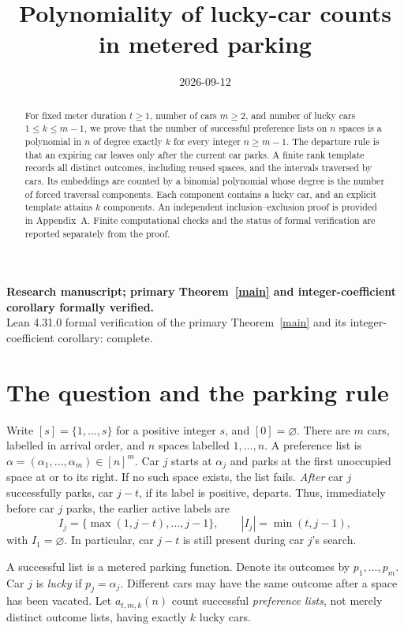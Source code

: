\documentclass[11pt]{article}
\title{Polynomiality of lucky-car counts in metered parking}
\author{}
\date{2026-09-12}
\theoremstyle{definition}
\begin{document}
\maketitle
\begin{center}
\textbf{Research manuscript; primary Theorem~\ref{main} and integer-coefficient corollary formally verified.}\\
Lean 4.31.0 formal verification of the primary Theorem~\ref{main} and its integer-coefficient corollary: complete.
\end{center}
\begin{abstract}
For fixed meter duration $t\ge1$, number of cars $m\ge2$, and number of lucky cars $1\le k\le m-1$, we prove that the number of successful preference lists on $n$ spaces is a polynomial in $n$ of degree exactly $k$ for every integer $n\ge m-1$. The departure rule is that an expiring car leaves only after the current car parks. A finite rank template records all distinct outcomes, including reused spaces, and the intervals traversed by cars. Its embeddings are counted by a binomial polynomial whose degree is the number of forced traversal components. Each component contains a lucky car, and an explicit template attains $k$ components. An independent inclusion--exclusion proof is provided in Appendix~A. Finite computational checks and the status of formal verification are reported separately from the proof.
\end{abstract}

\section{The question and the parking rule}
Write $[s]=\{1,\ldots,s\}$ for a positive integer $s$, and $[0]=\varnothing$. There are $m$ cars, labelled in arrival order, and $n$ spaces labelled $1,\ldots,n$. A preference list is $\alpha=(\alpha_1,\ldots,\alpha_m)\in[n]^m$. Car $j$ starts at $\alpha_j$ and parks at the first unoccupied space at or to its right. If no such space exists, the list fails. \emph{After} car $j$ successfully parks, car $j-t$, if its label is positive, departs. Thus, immediately before car $j$ parks, the earlier active labels are
\begin{equation}\label{active}
 I_j=\{\max(1,j-t),\ldots,j-1\},\qquad |I_j|=\min(t,j-1),
\end{equation}
with $I_1=\varnothing$. In particular, car $j-t$ is still present during car $j$'s search.

A successful list is a metered parking function. Denote its outcomes by $p_1,\ldots,p_m$. Car $j$ is \emph{lucky} if $p_j=\alpha_j$. Different cars may have the same outcome after a space has been vacated. Let $a_{t,m,k}(n)$ count successful \emph{preference lists}, not merely distinct outcome lists, having exactly $k$ lucky cars.
\end{document}
